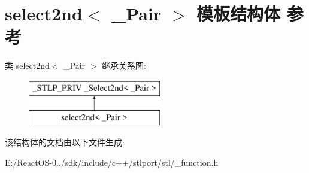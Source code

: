\hypertarget{structselect2nd}{}\section{select2nd$<$ \+\_\+\+Pair $>$ 模板结构体 参考}
\label{structselect2nd}
类 select2nd$<$ \+\_\+\+Pair $>$ 继承关系图\+:\begin{figure}[H]
\begin{center}
\leavevmode
\includegraphics[height=2.000000cm]{structselect2nd}
\end{center}
\end{figure}


该结构体的文档由以下文件生成\+:\begin{DoxyCompactItemize}
\item 
E\+:/\+React\+O\+S-\/0../sdk/include/c++/stlport/stl/\+\_\+function.\+h\end{DoxyCompactItemize}
